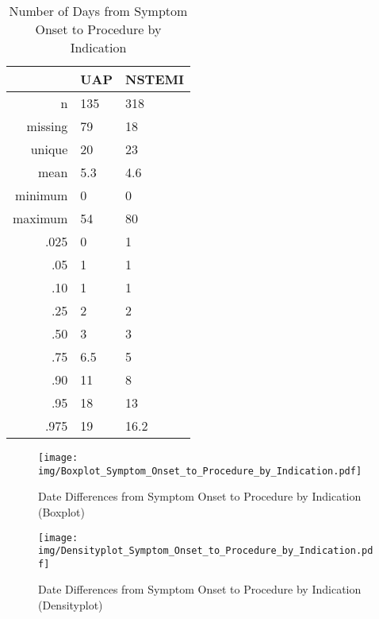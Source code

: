 \documentclass[presentation,xcolor=pdftex,dvipsnames,table,11pt]{beamer}
\begin{document}
\begin{tiny}
\begin{table}[ht]
\centering
\begin{tabular}{rll}
  \toprule
 & UAP & NSTEMI \\ 
  \midrule
n & 135 & 318 \\ 
  missing & 79 & 18 \\ 
  unique & 20 & 23 \\ 
  mean & 5.3 & 4.6 \\ 
  minimum & 0 & 0 \\ 
  maximum & 54 & 80 \\ 
  .025 & 0 & 1 \\ 
  .05 & 1 & 1 \\ 
  .10 & 1 & 1 \\ 
  .25 & 2 & 2 \\ 
  .50 & 3 & 3 \\ 
  .75 & 6.5 & 5 \\ 
  .90 & 11 & 8 \\ 
  .95 & 18 & 13 \\ 
  .975 & 19 & 16.2 \\ 
   \bottomrule
\end{tabular}
\caption{Number of Days from Symptom Onset to Procedure by Indication} 
\end{table}
\begin{frame}
\begin{figure}
  \centering
  \caption{Date Differences from Symptom Onset to Procedure by Indication (Boxplot)}
  \label{Boxplot: Date Differences from Symptom Onset to Procedure by Indication}
\texttt{[image: img/Boxplot\_Symptom\_Onset\_to\_Procedure\_by\_Indication.pdf]}\end{figure}
\end{frame}


\begin{frame}
\begin{figure}
  \centering
  \caption{Date Differences from Symptom Onset to Procedure by Indication (Densityplot)}
  \label{Density: Date Differences from Symptom Onset to Procedure by Indication}
\texttt{[image: img/Densityplot\_Symptom\_Onset\_to\_Procedure\_by\_Indication.pdf]}\end{figure}
\end{frame}





\end{tiny}
\end{document}
